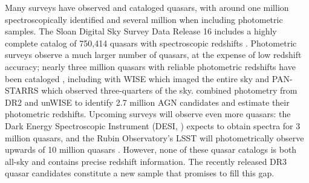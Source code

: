 Many surveys have observed and cataloged quasars, with around one million spectroscopically identified and several million when including photometric samples. 
The Sloan Digital Sky Survey Data Release 16 includes a highly complete catalog of 750,414 quasars with spectroscopic redshifts \citep{lyke_sloan_2020}.
Photometric surveys observe a much larger number of quasars, at the expense of low redshift accuracy; nearly three million quasars with reliable photometric redshifts have been cataloged \citep{kunsagi-mate_photometric_2022}, including with WISE \citep{wright_wide-field_2010} which imaged the entire sky and PAN-STARRS \citep{chambers_pan-starrs1_2019} which observed three-quarters of the sky.
\cite{shu_catalogues_2019} combined photometry from \Gaia DR2 and unWISE \citep{lang_unwise_2014} to identify 2.7 million AGN candidates and estimate their photometric redshifts.
Upcoming surveys will observe even more quasars: the Dark Energy Spectroscopic Instrument (DESI, \citealt{Aghamousa2016}) expects to obtain spectra for 3 million quasars, and the Rubin Observatory's LSST will photometrically observe upwards of 10 million quasars \citep{ivezic_lsst_2016}.
However, none of these quasar catalogs is both all-sky and contains precise redshift information.
The recently released \Gaia DR3 quasar candidates \citep{gaia_collaboration_gaia_2023} constitute a new sample that promises to fill this gap. 

